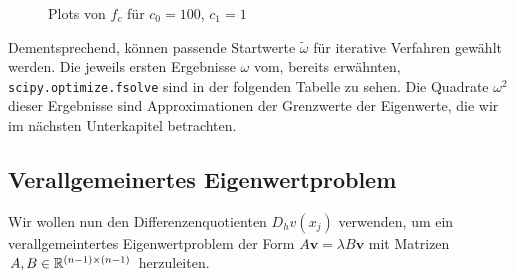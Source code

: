 \begin{figure}[H]
  \centering
  \hspace{0mm}
  \caption{Plots von $f_c$ für $c_0 = 100$, $c_1 = 1$}
  \label{fig:zero_function}
\end{figure}

Dementsprechend, können passende Startwerte $\tilde{\omega}$ für iterative Verfahren gewählt werden. Die jeweils ersten Ergebnisse $\omega$ vom, bereits erwähnten, \verb|scipy.optimize.fsolve| sind in der folgenden Tabelle zu sehen. Die Quadrate $\omega^2$ dieser Ergebnisse sind Approximationen der Grenzwerte der Eigenwerte, die wir im nächsten Unterkapitel betrachten. \\
\begin{center}


\vspace{10pt}
\end{center}

\subsection{Verallgemeinertes Eigenwertproblem}

Wir wollen nun den Differenzenquotienten $D_h v(x_j)$ verwenden, um ein verallgemeintertes Eigenwertproblem der Form $A \mathbf{v} = \lambda B \mathbf{v}$ mit Matrizen $A, B \in \mathbb{R}^{(n-1) \times (n-1)}$ herzuleiten. \\

